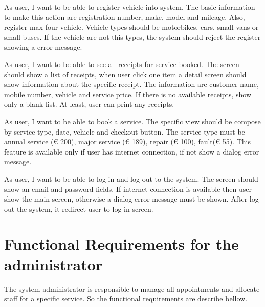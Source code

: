 \begin{description}[font=$\bullet$~\normalfont\scshape\color{red!50!black}]

\item [Register vehicle] As user, I want to be able to register vehicle into system. The  basic information to make this action are registration number, make, model and mileage. Also, register max four vehicle. Vehicle types should be motorbikes, cars, small vans or small buses. If the vehicle are not this types, the system should reject the register showing a error message.

\item [View receipts]As user, I want to be able to see all receipts for service booked. The screen should show a list of receipts, when user click  one item a detail screen should show information about the specific receipt. The information are customer name, mobile number, vehicle and service price. If there is no available receipts, show only a blank list. At least, user can print any receipts.

\item [Book service] As user, I want to be able to book a service. The specific view should be compose by service type, date, vehicle and checkout button. The service  type must be annual service (€ 200), major service (€ 189), repair (€ 100), fault(€ 55). This feature is available only if user has internet connection, if not show a dialog error message.

\item [Log in] As user, I want to be able to log in and log out to the system. The screen should  show an email and password fields. If internet connection is available then user show the main screen, otherwise a dialog error message must be shown. After log out the system, it redirect user to log in screen.

\end{description}

\newpage
\section{Functional Requirements for the administrator}

The system administrator is responsible to manage all appointments and allocate staff for a specific service. So the functional requirements are describe bellow.


